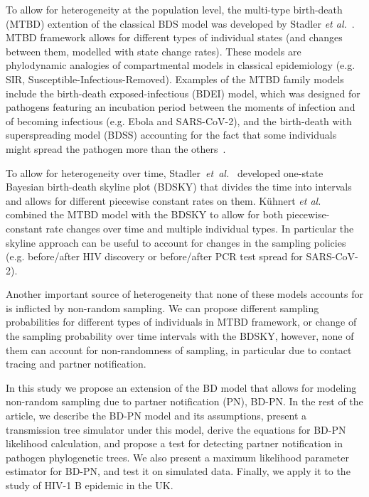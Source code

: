 \documentclass[a4paper,10pt]{article}
\begin{document}
To allow for heterogeneity at the population level, the multi-type birth-death (MTBD) extention of the classical BDS model was developed by Stadler \textit{et al.}~\cite{Stadler2013a}. MTBD framework allows for different types of individual states (and changes between them, modelled with state change rates). These models are phylodynamic analogies of compartmental models in classical epidemiology (e.g. SIR, Susceptible-Infectious-Removed).  Examples of the MTBD family models include the birth-death exposed-infectious (BDEI) model, which was designed for pathogens featuring an incubation period between the moments of infection and of becoming infectious (e.g. Ebola and SARS-CoV-2), and the birth-death with superspreading model (BDSS) accounting for the fact that some individuals might spread the pathogen more than the others~\cite{Stadler2014}.

To allow for heterogeneity over time, Stadler~\textit{et~al.}~\cite{Stadler2013} developed one-state Bayesian birth-death skyline plot (BDSKY) that divides the time into intervals and allows for different piecewise constant rates on them. K\"{u}hnert \textit{et al.}~\cite{Kuhnert2016} combined the MTBD model with the BDSKY to allow for both piecewise-constant rate changes over time and multiple individual types. In particular the skyline approach can be useful to account for changes in the sampling policies (e.g. before/after HIV discovery or before/after PCR test spread for SARS-CoV-2).


Another important source of heterogeneity that none of these models accounts for is inflicted by non-random sampling. We can propose different sampling probabilities for different types of individuals in MTBD framework, or change of the sampling probability over time intervals with the BDSKY, however, none of them can account for non-randomness of sampling, in particular due to contact tracing and partner notification. 

In this study we propose an extension of the BD model that allows for modeling non-random sampling due to partner notification (PN), BD-PN. In the rest of the article, we describe the BD-PN model and its assumptions, present a transmission tree simulator under this model, derive the equations for BD-PN likelihood calculation, and propose a test for detecting partner notification in pathogen phylogenetic trees. We also present a maximum likelihood parameter estimator for BD-PN, and test it on simulated data. Finally, we apply it to the study of HIV-1 B epidemic in the UK. 
\end{document}
